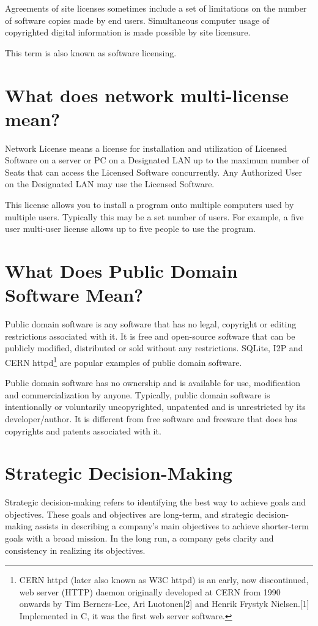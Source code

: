\documentclass[a4paper]{article}
\begin{document}
Agreements of site licenses sometimes include a set of limitations on the number of software copies made
by end users. Simultaneous computer usage of copyrighted digital information is made possible by site
licensure.

This term is also known as software licensing.

\section{What does network multi-license mean?}
Network License means a license for installation and utilization of Licensed
Software on a server or PC on a Designated LAN up to the maximum number of
Seats that can access the Licensed Software concurrently. Any Authorized User 
on the Designated LAN may use the Licensed Software.

This license allows you to install a program onto multiple computers used by
multiple users. Typically this may be a set number of users. For example, a
five user multi-user license allows up to five people to use the program.

\section{What Does Public Domain Software Mean?}
Public domain software is any software that has no legal, copyright or editing
restrictions associated with it. It is free and open-source software that can 
be publicly modified, distributed or sold without any restrictions. SQLite,
I2P and CERN httpd\footnote{CERN httpd (later also known as W3C httpd) is an
early, now discontinued, web server (HTTP) daemon originally developed at CERN
from 1990 onwards by Tim Berners-Lee, Ari Luotonen[2] and Henrik Frystyk
Nielsen.[1] Implemented in C, it was the first web server software.} are
popular examples of public domain software.

Public domain software has no ownership and is available for use, modification
and commercialization by anyone. Typically, public domain software is
intentionally or voluntarily uncopyrighted, unpatented and is unrestricted by
its developer/author. It is different from free software and freeware that
does has copyrights and patents associated with it.

\section{Strategic Decision-Making}
Strategic decision-making refers to identifying the best way to achieve goals and objectives. These goals and objectives are long-term, and strategic decision-making assists in describing a company's main objectives to achieve shorter-term goals with a broad mission. In the long run, a company gets clarity and consistency in realizing its objectives.
\end{document}
